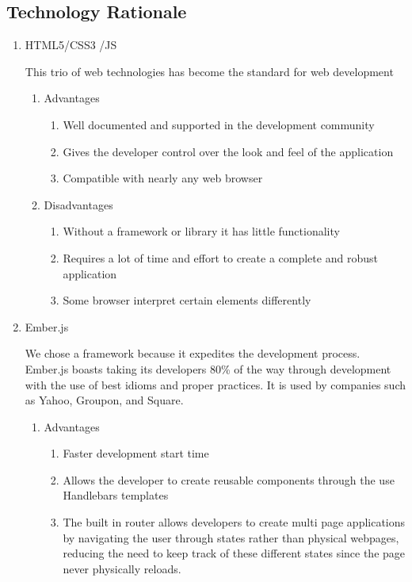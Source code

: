 \subsection{Technology Rationale}
\begin{enumerate}
\item HTML5/CSS3 /JS \par This trio of web technologies has become the standard for web development
\begin{enumerate}
\item Advantages
\begin{enumerate}
\item Well documented and supported in the development community
\item Gives the developer control over the look and feel of the application
\item Compatible with nearly any web browser
\end{enumerate}
\item Disadvantages
\begin{enumerate}
\item Without a framework or library it has little functionality
\item Requires a lot of time and effort to create a complete and robust application
\item Some browser interpret certain elements differently
\end{enumerate}
\end{enumerate}
\item Ember.js \par We chose a framework because it expedites the development process. Ember.js boasts taking its developers 80\% of the way through development with the use of best idioms and proper practices. It is used by companies such as Yahoo, Groupon, and Square\cite{ember}.
\begin{enumerate}
\item Advantages
\begin{enumerate}
\item Faster development start time
\item Allows the developer to create reusable components through the use Handlebars templates
\item The built in router allows developers to create multi page applications by navigating the user through states rather than physical webpages, reducing the need to keep track of these different states since the page never physically reloads. 
\end{enumerate}

\end{enumerate}
\end{enumerate}
